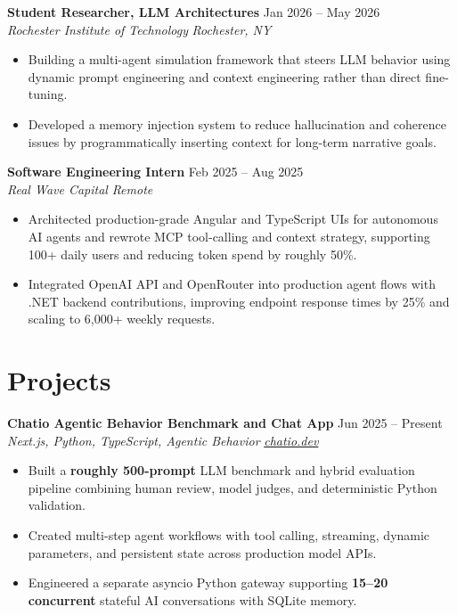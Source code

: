 \documentclass[10pt,letterpaper]{article}
\newif\ifresumeFirstRole
\newcommand{\resumeRole}[4]{%
  \ifresumeFirstRole
    \global\resumeFirstRolefalse
  \else
    \vspace{0pt plus 1fill}%
  \fi
  \textbf{#1} \hfill #2\\
  \textit{#3} \hfill \textit{#4}
}
\begin{document}
\resumeRole{Student Researcher, LLM Architectures}{Jan 2026 -- May 2026}{Rochester Institute of Technology}{Rochester, NY}
\begin{itemize}
  \item Building a multi-agent simulation framework that steers LLM behavior using dynamic prompt engineering and context engineering rather than direct fine-tuning.
  \item Developed a memory injection system to reduce hallucination and coherence issues by programmatically inserting context for long-term narrative goals.
\end{itemize}

\resumeRole{Software Engineering Intern}{Feb 2025 -- Aug 2025}{Real Wave Capital}{Remote}
\begin{itemize}
  \item Architected production-grade Angular and TypeScript UIs for autonomous AI agents and rewrote MCP tool-calling and context strategy, supporting 100+ daily users and reducing token spend by roughly 50\%.
  \item Integrated OpenAI API and OpenRouter into production agent flows with .NET backend contributions, improving endpoint response times by 25\% and scaling to 6,000+ weekly requests.
\end{itemize}

\section*{Projects}
\resumeRole{Chatio Agentic Behavior Benchmark and Chat App}{Jun 2025 -- Present}{Next.js, Python, TypeScript, Agentic Behavior}{\href{https://chatio.dev}{chatio.dev}}
\begin{itemize}
  \item Built a \textbf{roughly 500-prompt} LLM benchmark and hybrid evaluation pipeline combining human review, model judges, and deterministic Python validation.
  \item Created multi-step agent workflows with tool calling, streaming, dynamic parameters, and persistent state across production model APIs.
  \item Engineered a separate asyncio Python gateway supporting \textbf{15--20 concurrent} stateful AI conversations with SQLite memory.
\end{itemize}
\end{document}
